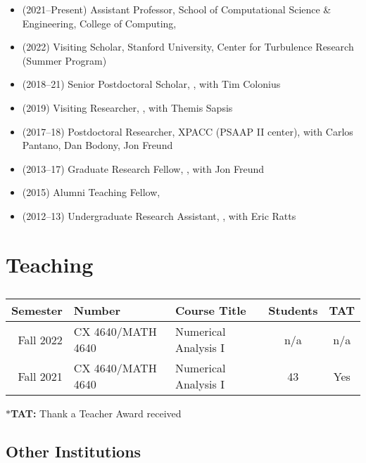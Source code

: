 \begin{itemize}
    \item (2021--Present) Assistant Professor, School of Computational Science \& Engineering, College of Computing, \GIT
    \item (2022) Visiting Scholar, Stanford University, Center for Turbulence Research (Summer Program)
    \item (2018--21) Senior Postdoctoral Scholar, \CIT, with Tim Colonius
    \item (2019) Visiting Researcher, \MIT, with Themis Sapsis
    \item (2017--18) Postdoctoral Researcher, XPACC (PSAAP II center), with Carlos Pantano, Dan Bodony, Jon Freund
    \item (2013--17) Graduate Research Fellow, \UIUC, with Jon Freund
    \item (2015) Alumni Teaching Fellow, \UIUC
    \item (2012--13) Undergraduate Research Assistant, \UMD, with Eric Ratts
\end{itemize}

\section{Teaching}

\subsection{\GIT}

\begin{center}
    \begin{tabular}{ r l l c c }
        \hline\hline
        \bf Semester  &\bf Number & \bf Course Title & \bf Students & \bf TAT \\
        \hline
        Fall 2022 & CX 4640/MATH 4640 & Numerical Analysis I & n/a & n/a \\
        Fall 2021 & CX 4640/MATH 4640 & Numerical Analysis I & 43 & Yes \\
        \hline\hline
    \end{tabular}
\end{center}
$\ast$\textbf{TAT:} Thank a Teacher Award received

\subsection{Other Institutions}

